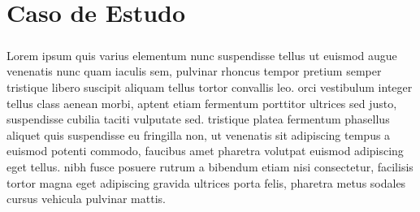 \chapter*{\thechapter \quad Caso de Estudo}
\paragraph{}
Lorem ipsum quis varius elementum nunc suspendisse tellus ut euismod augue venenatis nunc quam iaculis sem, pulvinar rhoncus tempor pretium semper tristique libero suscipit aliquam tellus tortor convallis leo. orci vestibulum integer tellus class aenean morbi, aptent etiam fermentum porttitor ultrices sed justo, suspendisse cubilia taciti vulputate sed. tristique platea fermentum phasellus aliquet quis suspendisse eu fringilla non, ut venenatis sit adipiscing tempus a euismod potenti commodo, faucibus amet pharetra volutpat euismod adipiscing eget tellus. nibh fusce posuere rutrum a bibendum etiam nisi consectetur, facilisis tortor magna eget adipiscing gravida ultrices porta felis, pharetra metus sodales cursus vehicula pulvinar mattis. 